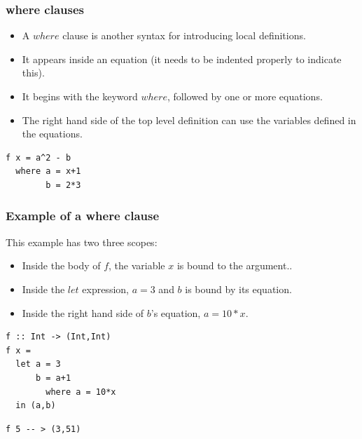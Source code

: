 \documentclass{beamer}
\begin{document}
\begin{frame}[fragile]
\frametitle{where clauses}

\begin{itemize}
\item A $where$ clause is another syntax for introducing local
  definitions.
\item It appears inside an equation (it needs to be indented
  properly to indicate this).
\item It begins with the keyword $where$, followed by one or more
  equations.
\item The right hand side of the top level definition can use the
  variables defined in the equations.
\end{itemize}

\begin{verbatim}
f x = a^2 - b
  where a = x+1
        b = 2*3
\end{verbatim}

\end{frame}

\begin{frame}[fragile]
\frametitle{Example of a where clause}

This example has two three scopes:

\begin{itemize}
\item Inside the body of $f$, the variable $x$ is bound to the argument..
\item Inside the $let$ expression, $a=3$ and $b$ is bound by its
  equation.
\item Inside the right hand side of $b$'s equation, $a=10*x$.
\end{itemize}

\begin{verbatim}
f :: Int -> (Int,Int)
f x =
  let a = 3
      b = a+1
        where a = 10*x
  in (a,b)
\end{verbatim}

\begin{verbatim}
f 5 -- > (3,51)
\end{verbatim}

\end{frame}
\end{document}
